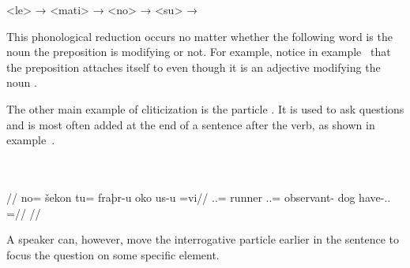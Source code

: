 	\a<le>  →     
	\a<mati>  →     
	\a<no>  →     
	\a<su>  →     
\xe

This phonological reduction occurs no matter whether the following word is the noun the preposition is modifying or not. For example, notice in example~ that the preposition attaches itself to   even though it is an adjective modifying the noun  .

The other main example of cliticization is the particle  . It is used to ask questions and is most often added at the end of a sentence after the verb, as shown in example~.

	\begingl
		\glpreamble{}\\
		\\
		//
		\gla no= šekon tu= fraþr-u oko us-u =vi//
		\glb \An.\Sg.\Top{}= runner \An.\Sg.\Acc{}= observant-\An{} dog have-\Ind.\Npst.\Ipfv{} =\Q//
		\glft{}//
	\endgl
\xe

A speaker can, however, move the interrogative particle earlier in the sentence to focus the question on some specific element.

